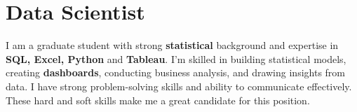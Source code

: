 
\section{Data Scientist}
\small{
    I am a graduate student with strong \textbf{statistical} background and expertise in \textbf{SQL, Excel, Python} and \textbf{Tableau}. I'm skilled in building statistical models, creating \textbf{dashboards}, conducting business analysis, and drawing insights from data. I have strong problem-solving skills and ability to communicate effectively. These hard and soft skills make me a great candidate for this position.
}